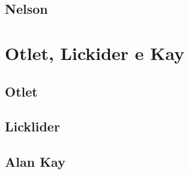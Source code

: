 \subsection{Nelson}

\section{Otlet, Lickider e Kay}

\subsection{Otlet}

\subsection{Licklider}

\subsection{Alan Kay}